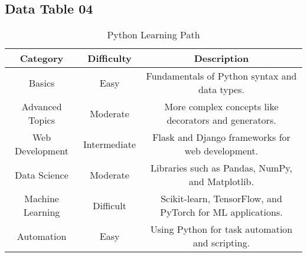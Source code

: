 \documentclass{article}
\begin{document}
\subsection{Data Table 04}
\begin{table}[h]
    \centering
    \begin{tabular}{|c|c|c|}
        \hline
        \textbf{Category} & \textbf{Difficulty} & \textbf{Description} \\
        \hline
        Basics & Easy & Fundamentals of Python syntax and data types. \\
        \hline
        Advanced Topics & Moderate & More complex concepts like decorators and generators. \\
        \hline
        Web Development & Intermediate & Flask and Django frameworks for web development. \\
        \hline
        Data Science & Moderate & Libraries such as Pandas, NumPy, and Matplotlib. \\
        \hline
        Machine Learning & Difficult & Scikit-learn, TensorFlow, and PyTorch for ML applications. \\
        \hline
        Automation & Easy & Using Python for task automation and scripting. \\
        \hline
    \end{tabular}
    \caption{Python Learning Path}
    \label{tab:PythonLearningPath}
\end{table}
\end{document}
